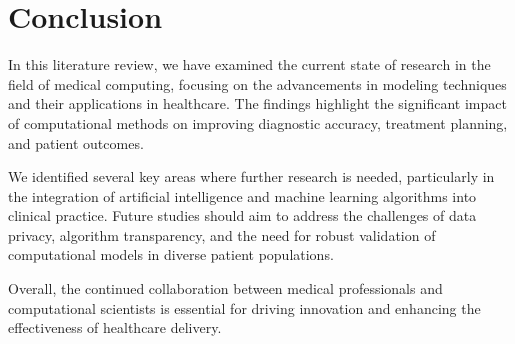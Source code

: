 
\section{Conclusion}

In this literature review, we have examined the current state of research in the field of medical computing, focusing on the advancements in modeling techniques and their applications in healthcare. The findings highlight the significant impact of computational methods on improving diagnostic accuracy, treatment planning, and patient outcomes.

We identified several key areas where further research is needed, particularly in the integration of artificial intelligence and machine learning algorithms into clinical practice. Future studies should aim to address the challenges of data privacy, algorithm transparency, and the need for robust validation of computational models in diverse patient populations.

Overall, the continued collaboration between medical professionals and computational scientists is essential for driving innovation and enhancing the effectiveness of healthcare delivery.